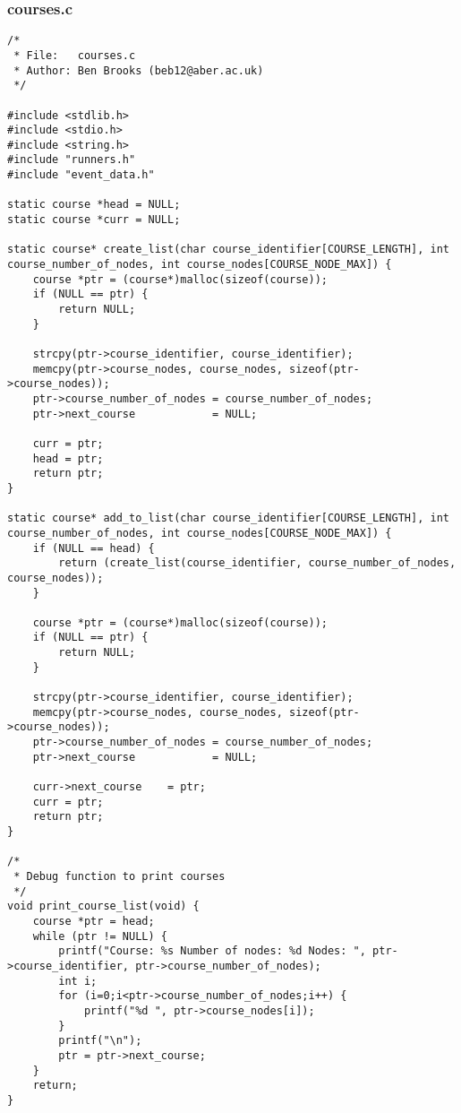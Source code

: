 \documentclass[pdftex,12pt,a4paper]{article}
\begin{document}
\subsubsection{courses.c}
\begin{verbatim}
/*
 * File:   courses.c
 * Author: Ben Brooks (beb12@aber.ac.uk)
 */

#include <stdlib.h>
#include <stdio.h>
#include <string.h>
#include "runners.h"
#include "event_data.h"

static course *head = NULL;
static course *curr = NULL;

static course* create_list(char course_identifier[COURSE_LENGTH], int course_number_of_nodes, int course_nodes[COURSE_NODE_MAX]) {
    course *ptr = (course*)malloc(sizeof(course));
    if (NULL == ptr) {
        return NULL;
    }

    strcpy(ptr->course_identifier, course_identifier);
    memcpy(ptr->course_nodes, course_nodes, sizeof(ptr->course_nodes));
    ptr->course_number_of_nodes = course_number_of_nodes;
    ptr->next_course            = NULL;

    curr = ptr;
    head = ptr;
    return ptr;
}

static course* add_to_list(char course_identifier[COURSE_LENGTH], int course_number_of_nodes, int course_nodes[COURSE_NODE_MAX]) {
    if (NULL == head) {
        return (create_list(course_identifier, course_number_of_nodes, course_nodes));
    }

    course *ptr = (course*)malloc(sizeof(course));
    if (NULL == ptr) {
        return NULL;
    }

    strcpy(ptr->course_identifier, course_identifier);
    memcpy(ptr->course_nodes, course_nodes, sizeof(ptr->course_nodes));
    ptr->course_number_of_nodes = course_number_of_nodes;
    ptr->next_course            = NULL;

    curr->next_course    = ptr;
    curr = ptr;
    return ptr;
}

/*
 * Debug function to print courses
 */
void print_course_list(void) {
    course *ptr = head;
    while (ptr != NULL) {
        printf("Course: %s Number of nodes: %d Nodes: ", ptr->course_identifier, ptr->course_number_of_nodes);
        int i;
        for (i=0;i<ptr->course_number_of_nodes;i++) {
            printf("%d ", ptr->course_nodes[i]);
        }
        printf("\n");
        ptr = ptr->next_course;
    }
    return;
}


\end{verbatim}
\end{document}
